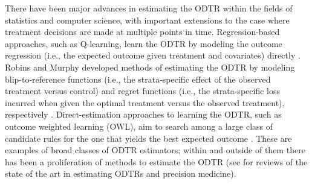 \documentclass[a4paper,12pt]{article}
\begin{document}
There have been major advances in estimating the ODTR within the fields of statistics and computer science, with important extensions to the case where treatment decisions are made at multiple points in time. Regression-based approaches, such as Q-learning, learn the ODTR by modeling the outcome regression (i.e., the expected outcome given treatment and covariates) directly \citep{murphy2003optimal, laber2014interactive, schulte2014q, moodie2012q, qian2011performance}. Robins and Murphy developed methods of estimating the ODTR by modeling blip-to-reference functions (i.e., the strata-specific effect of the observed treatment versus control) and regret functions (i.e., the strata-specific loss incurred when given the optimal treatment versus the observed treatment), respectively \citep{murphy2003optimal, robins2004optimal, moodie2007demystifying}. Direct-estimation approaches to learning the ODTR, such as outcome weighted learning (OWL), aim to search among a large class of candidate rules for the one that yields the best expected outcome \citep{zhao2012estimating, zhang2012estimating, zhao2015new}. These are examples of broad classes of ODTR estimators; within and outside of them there has been a proliferation of methods to estimate the ODTR (see \cite{kosorok2019precision, kosorok2015adaptive, zhao2014estimation} for reviews of the state of the art in estimating ODTRs and precision medicine).
\end{document}
